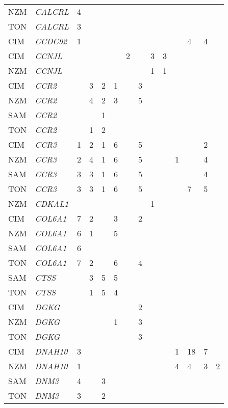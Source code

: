 \documentclass[twoside,openright]{report}
\begin{document}
\begin{ThreePartTable}
\begin{longtable}[t]{llllllllllllll}
NZM & \em{CALCRL} & 4 &  &  &  &  &  &  &  &  &  &  & \\
TON & \em{CALCRL} & 3 &  &  &  &  &  &  &  &  &  &  & \\
CIM & \em{CCDC92} & 1 &  &  &  &  &  &  &  &  & 4 & 4 & \\
CIM & \em{CCNJL} &  &  &  &  & 2 &  & 3 & 3 &  &  &  & \\
NZM & \em{CCNJL} &  &  &  &  &  &  & 1 & 1 &  &  &  & \\
CIM & \em{CCR2} &  & 3 & 2 & 1 &  & 3 &  &  &  &  &  & \\
NZM & \em{CCR2} &  & 4 & 2 & 3 &  & 5 &  &  &  &  &  & \\
SAM & \em{CCR2} &  &  & 1 &  &  &  &  &  &  &  &  & \\
TON & \em{CCR2} &  & 1 & 2 &  &  &  &  &  &  &  &  & \\
CIM & \em{CCR3} & 1 & 2 & 1 & 6 &  & 5 &  &  &  &  & 2 & \\
NZM & \em{CCR3} & 2 & 4 & 1 & 6 &  & 5 &  &  & 1 &  & 4 & \\
SAM & \em{CCR3} & 3 & 3 & 1 & 6 &  & 5 &  &  &  &  & 4 & \\
TON & \em{CCR3} & 3 & 3 & 1 & 6 &  & 5 &  &  &  & 7 & 5 & \\
NZM & \em{CDKAL1} &  &  &  &  &  &  & 1 &  &  &  &  & \\
CIM & \em{COL6A1} & 7 & 2 &  & 3 &  & 2 &  &  &  &  &  & \\
NZM & \em{COL6A1} & 6 & 1 &  & 5 &  &  &  &  &  &  &  & \\
SAM & \em{COL6A1} & 6 &  &  &  &  &  &  &  &  &  &  & \\
TON & \em{COL6A1} & 7 & 2 &  & 6 &  & 4 &  &  &  &  &  & \\
SAM & \em{CTSS} &  & 3 & 5 & 5 &  &  &  &  &  &  &  & \\
TON & \em{CTSS} &  & 1 & 5 & 4 &  &  &  &  &  &  &  & \\
CIM & \em{DGKG} &  &  &  &  &  & 2 &  &  &  &  &  & \\
NZM & \em{DGKG} &  &  &  & 1 &  & 3 &  &  &  &  &  & \\
TON & \em{DGKG} &  &  &  &  &  & 3 &  &  &  &  &  & \\
CIM & \em{DNAH10} & 3 &  &  &  &  &  &  &  & 1 & 18 & 7 & \\
NZM & \em{DNAH10} & 1 &  &  &  &  &  &  &  & 4 & 4 & 3 & 2\\
SAM & \em{DNM3} & 4 &  & 3 &  &  &  &  &  &  &  &  & \\
TON & \em{DNM3} & 3 &  & 2 &  &  &  &  &  &  &  &  & \\

\end{longtable}
\end{ThreePartTable}
\end{document}
